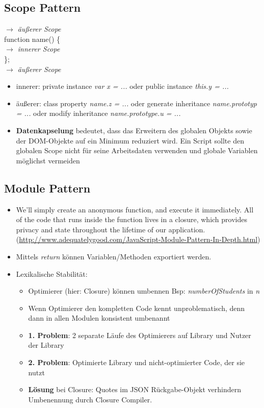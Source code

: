 \documentclass{article} %
\begin{document}
	\subsection{Scope Pattern}
		\textit{$\rightarrow$ äußerer Scope}\\
		function name() \{\\
		\textit{$\rightarrow$ innerer Scope}\\
		\};\\
		\textit{$\rightarrow$ äußerer Scope}\\
		\begin{itemize}
			\item innerer: 
			private instance \textit{var x = ...} oder 
			public instance \textit{this.y = ...}
			\item äußerer: 
			class property \textit{name.z = ...} oder
			generate inheritance \textit{name.prototyp = ...} oder
			modify inheritance \textit{name.prototype.u = ...}
			\item \textbf{Datenkapselung} bedeutet, dass das Erweitern des globalen Objekts sowie der DOM-Objekte auf ein Minimum reduziert wird. Ein Script sollte den globalen Scope nicht für seine Arbeitsdaten verwenden und globale Variablen möglichst vermeiden
		\end{itemize}
		\subsection{Module Pattern}
		\begin{itemize}
			\item We’ll simply create an anonymous function, and execute it immediately. All of the code that runs inside the function lives in a closure, which provides privacy and state throughout the lifetime of our application.\\
			(\url{http://www.adequatelygood.com/JavaScript-Module-Pattern-In-Depth.html})
			\item Mittels \textit{return} können Variablen/Methoden exportiert werden.
			\item Lexikalische Stabilität: 
			\begin{itemize}
				\item Optimierer (hier: Closure) können umbennen Bsp: \textit{numberOfStudents} in \textit{n}
				\item Wenn Optimierer den kompletten Code kennt unproblematisch, denn dann in allen Modulen konsistent umbenannt
				\item \textbf{1. Problem}: 2 separate Läufe des Optimierers auf Library und Nutzer der Library
				\item \textbf{2. Problem}: Optimierte Library und nicht-optimierter Code, der sie nutzt
				\item \textbf{Lösung} bei Closure: Quotes im JSON Rückgabe-Objekt verhindern Umbenennung durch Closure Compiler.
			\end{itemize}
		\end{itemize}
\end{document}
